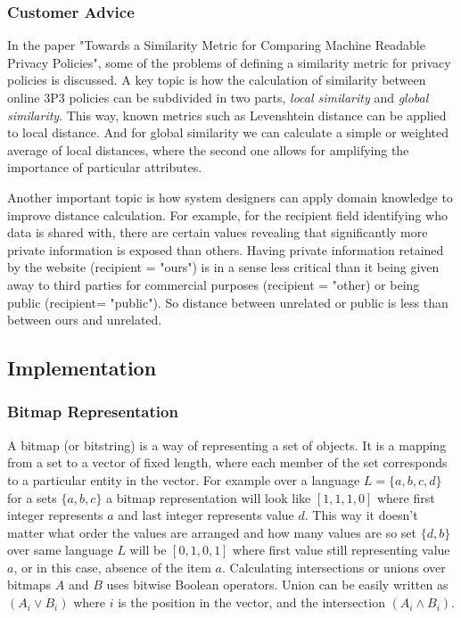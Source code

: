 \subsubsection{Customer Advice}

In the paper "Towards a Similarity Metric for Comparing Machine Readable Privacy Policies", some of the problems of defining a similarity metric for privacy policies is discussed. A key topic is how the calculation of similarity between online 3P3 policies can be subdivided in two parts, \emph{local similarity} and \emph{global similarity}. This way, known metrics such as Levenshtein distance  can be applied to local distance. And for global similarity we can calculate a simple or weighted average of local distances, where the second one allows for amplifying the importance of particular attributes.

Another important topic is how system designers can apply domain knowledge to improve distance calculation. For example, for the recipient field identifying who data is shared with, there are certain values revealing that significantly more private information is exposed than others. Having private information retained by the website (recipient = "ours") is in a sense less critical than it being given away to third parties for commercial purposes (recipient = "other) or being public (recipient= "public"). So distance between unrelated or public is less than between ours and unrelated.

\subsection{Implementation}

\subsubsection{Bitmap Representation}
A bitmap (or bitstring) is a way of representing a set of objects. It is a mapping from a set to a vector of fixed length, where each member of the set corresponds to a particular entity in the vector. For example over a language $L=\{a,b,c,d\}$ for a sets $\{a,b,c\}$ a bitmap representation will look like $[1, 1, 1, 0]$ where first integer represents $a$ and last integer represents value $d$. This way it doesn't matter what order the values are arranged and how many values are so set $\{d,b\}$ over same language $L$ will be $[0, 1, 0, 1]$ where first value still representing value $a$, or in this case, absence of the item $a$. Calculating intersections or unions over bitmaps $A$ and $B$ uses bitwise Boolean operators. Union can be easily written as $(A_i \vee B_i)$ where $i$ is the position in the vector, and the intersection $(A_i \wedge B_i)$.

